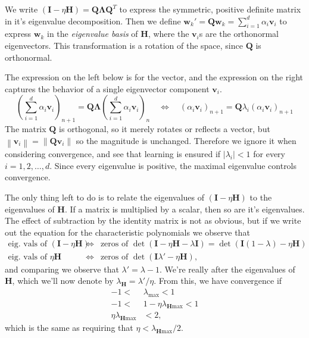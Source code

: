 \documentclass[12pt, a4paper]{article}
\newcommand{\vect}[1]{\bm{#1}}
\newcommand{\norm}[1]{\left\lVert#1\right\rVert}
\newcommand{\abs}[1]{\left\lvert#1\right\rvert}
\begin{document}
{\begin{easylist}[enumerate]
We write $\left( \vect{I} - \eta  \vect{H} \right) = \vect{Q} \vect{\Lambda} \vect{Q}^T$ to express the symmetric, positive definite matrix in it's eigenvalue decomposition.
Then we define $\vect{w}_{k}' = \vect{Q} \vect{w}_{k} = \sum_{i=1}^{d} \alpha_i \vect{v}_i$ to express $\vect{w}_{k}$ in the \emph{eigenvalue basis} of $\vect{H}$, where the $\vect{v}_i$s are the orthonormal eigenvectors. 
This transformation is a rotation of the space, since $\vect{Q}$ is orthonormal.

The expression on the left below is for the vector, and the expression on the right captures the behavior of a single eigenvector component $\vect{v}_i$.
\begin{equation*}
	\left(\sum_{i=1}^{d} \alpha_i \vect{v}_i\right)_{n+1} = \vect{Q} \vect{\Lambda} \left(\sum_{i=1}^{d} \alpha_i \vect{v}_i\right)_{n}
	\quad \Leftrightarrow \quad
	(\alpha_i \vect{v}_i)_{n+1} = \vect{Q} \lambda_i (\alpha_i \vect{v}_i)_{n+1}
\end{equation*}
The matrix $\vect{Q}$ is orthogonal, so it merely rotates or reflects a vector, but $\norm{\vect{v}_i} = \norm{\vect{Q} \vect{v}_i}$ so the magnitude is unchanged.
Therefore we ignore it when considering convergence, and see that learning is ensured if $\abs{\lambda_i} < 1$ for every $i=1, 2, \dots, d$.
Since every eigenvalue is positive, the maximal eigenvalue controls convergence.

The only thing left to do is to relate the eigenvalues of $\left( \vect{I} - \eta  \vect{H} \right)$ to the eigenvalues of $ \vect{H}$.
If a matrix is multiplied by a scalar, then so are it's eigenvalues.
The effect of subtraction by the identity matrix is not as obvious, but if we write out the equation for the characteristic polynomials we observe that
\begin{align*}
	\text{eig. vals of } \left( \vect{I} - \eta  \vect{H} \right) \, &\Leftrightarrow \, \text{ zeros of } \det \left(  \vect{I} -  \eta  \vect{H} - \lambda \vect{I} \right)
	=
	\det \left(  \vect{I} (1 - \lambda ) - \eta  \vect{H} \right)
	 \\
	\text{eig. vals of } \eta  \vect{H} \, &\Leftrightarrow \, \text{ zeros of } \det \left(  \vect{I} \lambda'  - \eta   \vect{H} \right),
\end{align*}
and comparing we observe that $\lambda' = \lambda - 1$.
We're really after the eigenvalues of $\vect{H}$, which we'll now denote by $\lambda_{\vect{H}} = \lambda' / \eta$.
From this, we have convergence if
\begin{align*}
	-1 < &\lambda_{\text{max}} < 1 \\
	-1 < &1 - \eta \lambda_{\vect{H} \text{max}} < 1 \\
	\eta \lambda_{\vect{H} \text{max}} &< 2,
\end{align*}
which is the same as requiring that $\eta < \lambda_{\vect{H} \text{max}} / 2$.


\end{easylist}}
\end{document}
